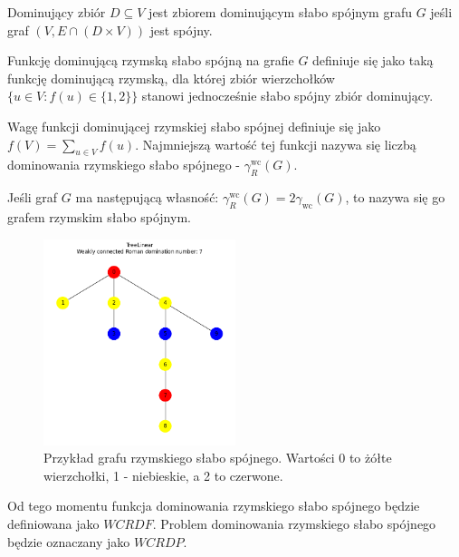 \begin{definition}
    Dominujący zbiór $D \subseteq V$ jest zbiorem dominującym słabo spójnym grafu $G$ jeśli graf $(V,E \cap (D \times V))$ jest spójny.
\end{definition}

\begin{definition}
    Funkcję dominującą rzymską słabo spójną na grafie $G$ definiuje się jako taką funkcję dominującą rzymską, dla której zbiór wierzchołków $\{u \in V: f(u) \in \{1,2\}\}$ stanowi jednocześnie słabo spójny zbiór dominujący.
\end{definition}

\begin{definition}
    Wagę funkcji dominującej rzymskiej słabo spójnej definiuje się jako $f(V) = \sum_{u \in V}{f(u)}$. Najmniejszą wartość tej funkcji nazywa się liczbą dominowania rzymskiego słabo spójnego - $\gamma_{R}^{\text{wc}}(G)$. 
\end{definition}

\begin{definition}
    Jeśli graf $G$ ma następującą własność: $\gamma_{R}^{\text{wc}}(G) = 2\gamma_{\text{wc}}(G)$, to nazywa się go grafem rzymskim słabo spójnym.
\end{definition}

\begin{figure}[H]
    \centering
    \includegraphics[width=0.5\textwidth]{assets/phase2.png}
    \caption{Przykład grafu rzymskiego słabo spójnego. Wartości 0 to żółte wierzchołki, 1 - niebieskie, a 2 to czerwone.}
    \label{fig:przykladWCRDF}
\end{figure}

Od tego momentu funkcja dominowania rzymskiego słabo spójnego będzie definiowana jako $WCRDF$. Problem dominowania rzymskiego słabo spójnego będzie oznaczany jako $WCRDP$.

